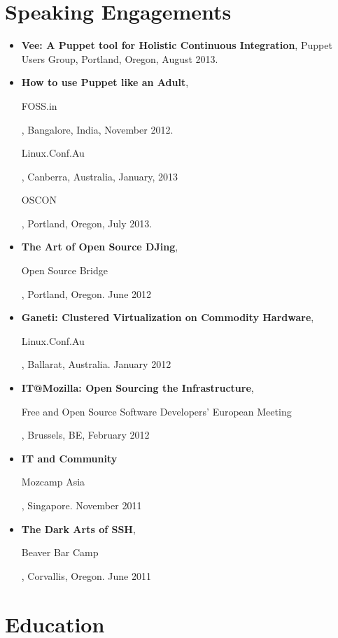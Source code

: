 \documentclass[a4paper,12pt]{report}
\begin{document}
\section*{Speaking Engagements}
\begin{itemize} \itemsep -0.25em
\item \textbf{Vee: A Puppet tool for Holistic Continuous Integration}, Puppet Users Group, Portland, Oregon, August 2013.
\item \textbf{How to use Puppet like an Adult}, \begin{it}FOSS.in\end{it}, Bangalore, India, November 2012. \begin{it}Linux.Conf.Au\end{it}, Canberra, Australia, January, 2013 \begin{it}OSCON\end{it}, Portland, Oregon, July 2013.
\item \textbf{The Art of Open Source DJing}, \begin{it}Open Source Bridge\end{it}, Portland, Oregon. June 2012
\item \textbf{Ganeti: Clustered Virtualization on Commodity Hardware}, \begin{it}Linux.Conf.Au\end{it}, Ballarat, Australia. January 2012
\item \textbf{IT@Mozilla: Open Sourcing the Infrastructure}, \begin{it}Free and Open Source Software Developers' European Meeting\end{it}, Brussels, BE, February 2012
\item \textbf{IT and Community} \begin{it}Mozcamp Asia\end{it}, Singapore. November 2011
\item \textbf{The Dark Arts of SSH}, \begin{it}Beaver Bar Camp\end{it}, Corvallis, Oregon. June 2011
\end{itemize}


\section*{Education}
\end{document}
